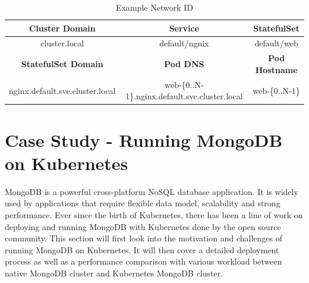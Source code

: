 \documentclass[sigconf]{acmart}
\begin{document}
\begin{table}[]
    \centering
    \begin{tabular}{|c|c|c|}
        \hline
        \textbf{Cluster Domain} & \textbf{Service} & \textbf{StatefulSet} \\
        \hline
        cluster.local & default/ngnix & default/web \\
        \hline
        \textbf{StatefulSet Domain} & \textbf{Pod DNS} & \textbf{Pod Hostname} \\
        \hline
        nginx.default.svc.cluster.local & web-\{0..N-1\}.nginx.default.svc.cluster.local & web-\{0..N-1\} \\ 
        \hline
    \end{tabular}
    \caption{Example Network ID}
    \label{tab:Stateful Network}
\end{table}

\section{Case Study - Running MongoDB on Kubernetes}
MongoDB is a powerful cross-platform NoSQL database application. It is widely used by applications that require flexible data model, scalability and strong performance. Ever since the birth of Kubernetes, there has been a line of work on deploying and running MongoDB with Kubernetes done by the open source community. This section will first look into the motivation and challenges of running MongoDB on Kubernetes. It will then cover a detailed deployment process as well as a performance comparison with various workload between native MongoDB cluster and Kubernetes MongoDB cluster.
\end{document}
